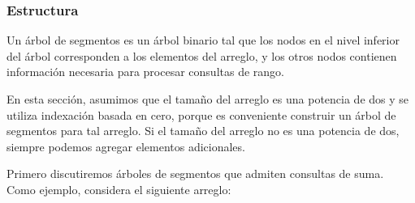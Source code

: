 \subsubsection{Estructura}

Un árbol de segmentos es un árbol binario
tal que los nodos en el nivel inferior del árbol
corresponden a los elementos del arreglo,
y los otros nodos
contienen información necesaria para procesar consultas de rango.

En esta sección, asumimos que el tamaño
del arreglo es una potencia de dos y se utiliza indexación basada en cero,
porque es conveniente construir
un árbol de segmentos para tal arreglo.
Si el tamaño del arreglo no es una potencia de dos,
siempre podemos agregar elementos adicionales.

Primero discutiremos árboles de segmentos que admiten consultas de suma.
Como ejemplo, considera el siguiente arreglo:
\begin{center}
\end{center}

